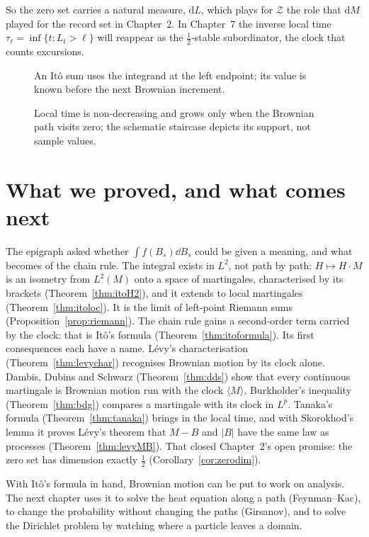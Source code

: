 So the zero set carries a natural measure, $\mathrm dL$, which plays for $\mathcal Z$ the role that $\mathrm dM$ played for the record set in Chapter~2.
In Chapter~7 the inverse local time $\tau_\ell=\inf\{t:L_t>\ell\}$ will reappear as the $\frac12$-stable subordinator, the clock that counts excursions.

\begin{figure}[ht]
\centering
{}
\caption{An Itô sum uses the integrand at the left endpoint; its value is known before the next Brownian increment.}
\label{fig:v12itosums}
\end{figure}

\begin{figure}[ht]
\centering
{}
\caption{Local time is non-decreasing and grows only when the Brownian path visits zero; the schematic staircase depicts its support, not sample values.}
\label{fig:v12tanaka}
\end{figure}

\section{What we proved, and what comes next}

The epigraph asked whether $\int f(B_s)\dd B_s$ could be given a meaning, and what becomes of the chain rule. The integral exists in $L^2$, not path by
path: $H\mapsto H\cdot M$ is an isometry from $L^2(M)$ onto a space of martingales, characterised by its brackets (Theorem~\ref{thm:itoH2}), and it extends
to local martingales (Theorem~\ref{thm:itoloc}). It is the limit of left-point Riemann sums (Proposition~\ref{prop:riemann}). The chain rule gains a
second-order term carried by the clock: that is It\^o's formula (Theorem~\ref{thm:itoformula}). Its first consequences each have a name. L\'evy's
characterisation (Theorem~\ref{thm:levychar}) recognises Brownian motion by its clock alone. Dambis, Dubins and Schwarz (Theorem~\ref{thm:dds}) show that
every continuous martingale is Brownian motion run with the clock $\langle M\rangle$. Burkholder's inequality (Theorem~\ref{thm:bdg}) compares a martingale with
its clock in $L^p$. Tanaka's formula (Theorem~\ref{thm:tanaka}) brings in the local time, and with Skorokhod's lemma it proves L\'evy's theorem that $M-B$ and
$|B|$ have the same law as processes (Theorem~\ref{thm:levyMB}). That closed Chapter~2's open promise: the zero set has dimension exactly $\frac12$
(Corollary~\ref{cor:zerodim}).

With It\^o's formula in hand, Brownian motion can be put to work on analysis. The next chapter uses it to solve the heat equation along a path
(Feynman--Kac), to change the probability without changing the paths (Girsanov), and to solve the Dirichlet problem by watching where a particle leaves a domain.


